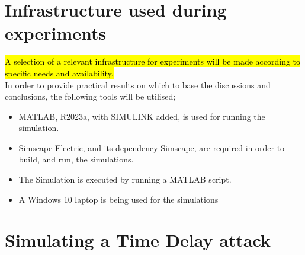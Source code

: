 \section{Infrastructure used during experiments }
\hl{A selection of a relevant infrastructure for experiments will be made according to  specific needs and availability.  }\\ 

In order to provide practical results on which to base the discussions and conclusions, the following tools will be utilised;

\begin{itemize}
    \item MATLAB, R2023a, with SIMULINK added, is used for running the simulation. 
    \item Simscape Electric, and its dependency Simscape, are required in order to build, and run, the simulations.
    \item The Simulation is executed by running a MATLAB script.
    \item A Windows 10 laptop is being used for the simulations
    

\end{itemize}





\section{Simulating a Time Delay attack}



